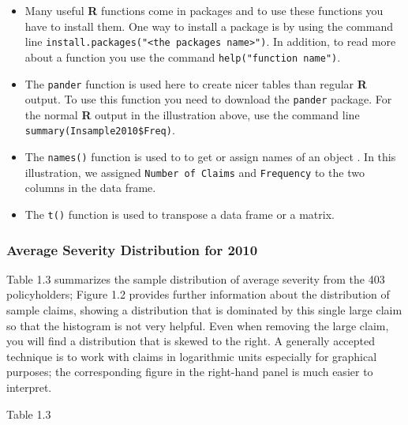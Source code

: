 \documentclass[]{book}
\newenvironment{Shaded}{\begin{snugshade}}{\end{snugshade}}
\newcommand{\KeywordTok}[1]{\textcolor[rgb]{0.13,0.29,0.53}{\textbf{#1}}}
\newcommand{\DecValTok}[1]{\textcolor[rgb]{0.00,0.00,0.81}{#1}}
\newcommand{\StringTok}[1]{\textcolor[rgb]{0.31,0.60,0.02}{#1}}
\newcommand{\OperatorTok}[1]{\textcolor[rgb]{0.81,0.36,0.00}{\textbf{#1}}}
\newcommand{\NormalTok}[1]{#1}
\theoremstyle{definition}
\theoremstyle{definition}
\theoremstyle{definition}
\theoremstyle{remark}
\begin{document}
\begin{itemize}
\item
  Many useful \textbf{R} functions come in packages and to use these
  functions you have to install them. One way to install a package is by
  using the command line
  \texttt{install.packages("\textless{}the\ package\textquotesingle{}s\ name\textgreater{}")}.
  In addition, to read more about a function you use the command
  \texttt{help("function\ name")}.
\item
  The \texttt{pander} function is used here to create nicer tables than
  regular \textbf{R} output. To use this function you need to download
  the \texttt{pander} package. For the normal \textbf{R} output in the
  illustration above, use the command line
  \texttt{summary(Insample2010\$Freq)}.
\item
  The \texttt{names()} function is used to to get or assign names of an
  object . In this illustration, we assigned \texttt{Number\ of\ Claims}
  and \texttt{Frequency} to the two columns in the data frame.
\item
  The \texttt{t()} function is used to transpose a data frame or a
  matrix.
\end{itemize}

\subsubsection{Average Severity Distribution for
2010}\label{average-severity-distribution-for-2010}

Table 1.3 summarizes the sample distribution of average severity from
the 403 policyholders; Figure 1.2 provides further information about the
distribution of sample claims, showing a distribution that is dominated
by this single large claim so that the histogram is not very helpful.
Even when removing the large claim, you will find a distribution that is
skewed to the right. A generally accepted technique is to work with
claims in logarithmic units especially for graphical purposes; the
corresponding figure in the right-hand panel is much easier to
interpret.

Table 1.3

\begin{Shaded}
\end{Shaded}
\end{document}
